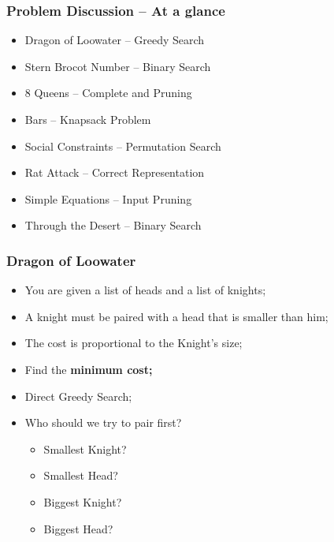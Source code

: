 \begin{frame}
  \frametitle{Problem Discussion -- At a glance}

  \begin{itemize}
  \item Dragon of Loowater -- Greedy Search
  \item Stern Brocot Number -- Binary Search
  \item 8 Queens -- Complete and Pruning
  \item Bars -- Knapsack Problem
  \item Social Constraints -- Permutation Search
  \item Rat Attack -- Correct Representation
  \item Simple Equations -- Input Pruning
  \item Through the Desert -- Binary Search
  \end{itemize}  
\end{frame}

\begin{frame}
  \frametitle{Dragon of Loowater}

  {\small 
  \begin{block}{}
    \begin{itemize}
    \item You are given a list of heads and a list of knights;
    \item A knight must be paired with a head that is smaller than him;
    \item The cost is proportional to the Knight's size;
    \item Find the {\bf minimum cost;}
    \end{itemize}
  \end{block}
  
  \begin{itemize}
  \item Direct Greedy Search;
  \item Who should we try to pair first?
    \begin{itemize}
    \item Smallest Knight?
    \item Smallest Head?
    \item Biggest Knight?
    \item Biggest Head?
    \end{itemize}
  \end{itemize}
  }
\end{frame}

